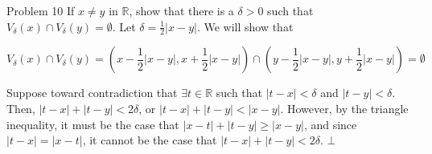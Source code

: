 \documentclass[10pt]{extarticle}
\newcommand{\R}{\mathbb{R}}
\begin{document}
  \begin{problem}{Problem 10}
    If $x\neq y$ in $\R$, show that there is a $\delta > 0$ such that $V_{\delta}(x) \cap V_{\delta}(y) = \emptyset$.
    \tcblower
  Let $\delta = \frac{1}{2}|x-y|$. We will show that

  \[V_{\delta}(x) \cap V_{\delta}(y) = \left(x-\frac{1}{2}|x-y|,x+\frac{1}{2}|x-y|\right)\cap \left(y-\frac{1}{2}|x-y|,y+\frac{1}{2}|x-y|\right) = \emptyset\]

    Suppose toward contradiction that $\exists t\in \R$ such that $|t-x| < \delta$ and $|t-y| < \delta$. Then, $|t-x| + |t-y| < 2\delta$, or $|t-x| + |t-y| < |x-y|$. However, by the triangle inequality, it must be the case that $|x-t| + |t-y| \geq |x-y|$, and since $|t-x| = |x-t|$, it cannot be the case that $|t-x| + |t-y| < 2\delta$. $\bot$
  \end{problem}
\end{document}
